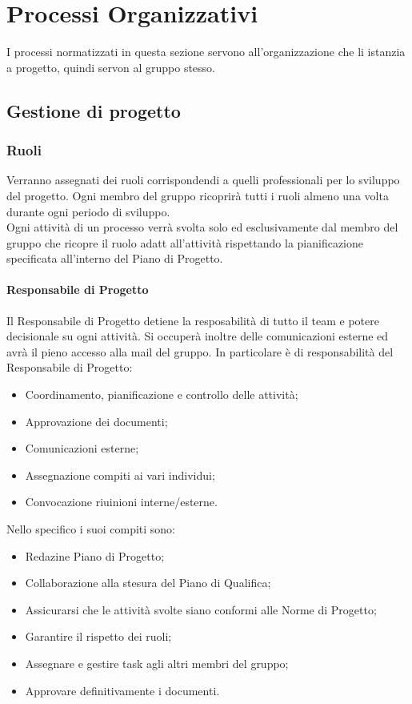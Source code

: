\section{Processi Organizzativi}
  I processi normatizzati in questa sezione servono all'organizzazione che li istanzia a progetto, quindi servon al gruppo stesso.
  \subsection{Gestione di progetto}
    \subsubsection{Ruoli}
      Verranno assegnati dei ruoli corrispondendi a quelli professionali per lo sviluppo del progetto. Ogni membro del gruppo ricoprirà
      tutti i ruoli almeno una volta durante ogni periodo di sviluppo.\\
      Ogni attività di un processo verrà svolta solo ed esclusivamente dal membro del gruppo che ricopre il ruolo adatt all'attività rispettando la pianificazione
      specificata all'interno del Piano di Progetto.
        \paragraph{Responsabile di Progetto}
          Il Responsabile di Progetto detiene la resposabilità di tutto il team e potere decisionale su ogni attività. Si occuperà inoltre delle comunicazioni esterne
          ed avrà il pieno accesso alla mail del gruppo.
          In particolare è di responsabilità del Responsabile di Progetto:
          \begin{itemize}
            \item Coordinamento, pianificazione e controllo delle attività;
            \item Approvazione dei documenti;
            \item Comunicazioni esterne;
            \item Assegnazione compiti ai vari individui;
            \item Convocazione riuinioni interne/esterne.
          \end{itemize}
          Nello specifico i suoi compiti sono:
          \begin{itemize}
            \item Redazine Piano di Progetto;
            \item Collaborazione alla stesura del Piano di Qualifica;
            \item Assicurarsi che le attività svolte siano conformi alle Norme di Progetto;
            \item Garantire il rispetto dei ruoli;
            \item Assegnare e gestire task agli altri membri del gruppo;
            \item Approvare definitivamente i documenti.
          \end{itemize}
